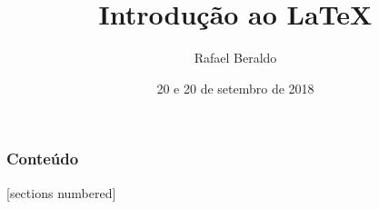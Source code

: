 \documentclass[final]{beamer}
\title{Introdução ao \LaTeX}
\author{Rafael Beraldo \qquad \email{rberaldo@cabaladada.org}}
\date{20 e 20 de setembro de 2018}
\begin{document}
\maketitle

\begin{frame}
  \frametitle{Conteúdo}
  [sections numbered]
  \begin{multicols}{2}
    \tableofcontents
  \end{multicols}
\end{frame}





















\end{document}

